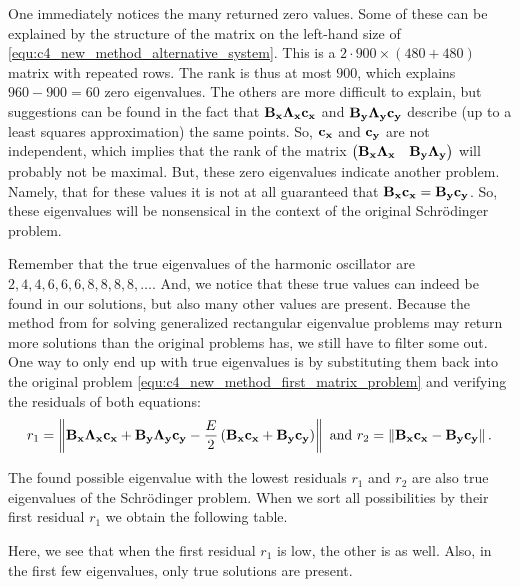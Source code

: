 One immediately notices the many returned zero values. Some of these can be explained by the structure of the matrix on the left-hand size of \eqref{equ:c4_new_method_alternative_system}. This is a $2\cdot 900 \times (480 + 480)$ matrix with repeated rows. The rank is thus at most $900$, which explains $960 - 900 = 60$ zero eigenvalues. The others are more difficult to explain, but suggestions can be found in the fact that $\vb{B_x} \vb{\Lambda_x} \vb{c_x}$ and $\vb{B_y} \vb{\Lambda_y} \vb{c_y}$ describe (up to a least squares approximation) the same points. So, $\vb{c_x}$ and $\vb{c_y}$ are not independent, which implies that the rank of the matrix $\begin{pmatrix} \vb{B_x} \vb{\Lambda_x} & \vb{B_y} \vb{\Lambda_y}\end{pmatrix}$ will probably not be maximal. But, these zero eigenvalues indicate another problem. Namely, that for these values it is not at all guaranteed that $\vb{B_x} \vb{c_x} = \vb{B_y} \vb{c_y}$. So, these eigenvalues will be nonsensical in the context of the original Schrödinger problem.

Remember that the true eigenvalues of the harmonic oscillator are $2, 4, 4, 6, 6, 6, 8, 8, 8, 8, \dots$. And, we notice that these true values can indeed be found in our solutions, but also many other values are present. Because the method from \cite{hua_svd_1991} for solving generalized rectangular eigenvalue problems may return more solutions than the original problems has, we still have to filter some out. One way to only end up with true eigenvalues is by substituting them back into the original problem \eqref{equ:c4_new_method_first_matrix_problem} and verifying the residuals of both equations:
$$
    r_1 = \left\| \vb{B_x} \vb{\Lambda_x} \vb{c_x} + \vb{B_y} \vb{\Lambda_y} \vb{c_y} - \frac{E}{2}\left(\vb{B_x}\vb{c_x} + \vb{B_y}\vb{c_y}\right) \right\| \text{ and } r_2=\left\| \vb{B_x} \vb{c_x} - \vb{B_y} \vb{c_y} \right\|\text{.}
$$

The found possible eigenvalue with the lowest residuals $r_1$ and $r_2$ are also true eigenvalues of the Schrödinger problem. When we sort all possibilities by their first residual $r_1$ we obtain the following table.

\begin{center}
    
\end{center}

Here, we see that when the first residual $r_1$ is low, the other is as well. Also, in the first few eigenvalues, only true solutions are present.

